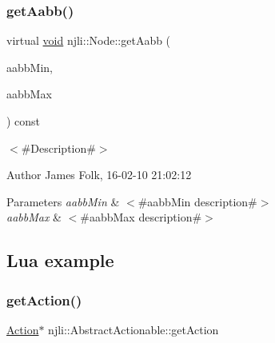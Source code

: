 \begin{DoxyCodeInclude}
\end{DoxyCodeInclude}
\mbox{\label{classnjli_1_1_node_ace3971fd38146ecf3b501b5a71246b55}} 
\subsubsection{\texorpdfstring{get\+Aabb()}{getAabb()}}
{\footnotesize\ttfamily virtual \mbox{\hyperlink{_thread_8h_af1e856da2e658414cb2456cb6f7ebc66}{void}} njli\+::\+Node\+::get\+Aabb (\begin{DoxyParamCaption}\item[{bt\+Vector3 \&}]{aabb\+Min,  }\item[{bt\+Vector3 \&}]{aabb\+Max }\end{DoxyParamCaption}) const\hspace{0.3cm}{\ttfamily [virtual]}}



$<$\#\+Description\#$>$ 

\begin{DoxyAuthor}{Author}
James Folk, 16-\/02-\/10 21\+:02\+:12
\end{DoxyAuthor}

\begin{DoxyParams}{Parameters}
{\em aabb\+Min} & $<$\#aabb\+Min description\#$>$ \\
\hline
{\em aabb\+Max} & $<$\#aabb\+Max description\#$>$\\
\hline
\end{DoxyParams}
\hypertarget{classnjli_1_1_steering_behavior_wander_ex1}{}\subsection{Lua example}\label{classnjli_1_1_steering_behavior_wander_ex1}

\begin{DoxyCodeInclude}
\end{DoxyCodeInclude}
\mbox{\label{classnjli_1_1_node_a2e853aeb7805f7fb878acc2f4ebafadb}} 
\subsubsection{\texorpdfstring{get\+Action()}{getAction()}}
{\footnotesize\ttfamily \mbox{\hyperlink{classnjli_1_1_action}{Action}}$\ast$ njli\+::\+Abstract\+Actionable\+::get\+Action}

